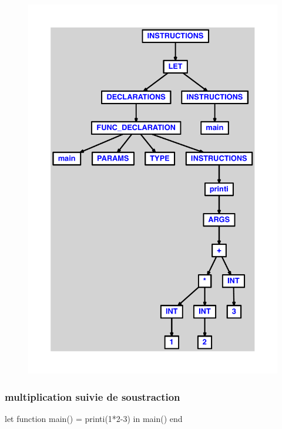 \documentclass{article}
\begin{document}
\begin{figure}[H]\centering\includegraphics[max width=\textwidth]{ast/ast_47.pdf}\end{figure}\subsubsection{multiplication suivie de soustraction}
\begin{verbatimtab}
let
	function main() = printi(1*2-3)
in main() end
\end{verbatimtab}
\end{document}

